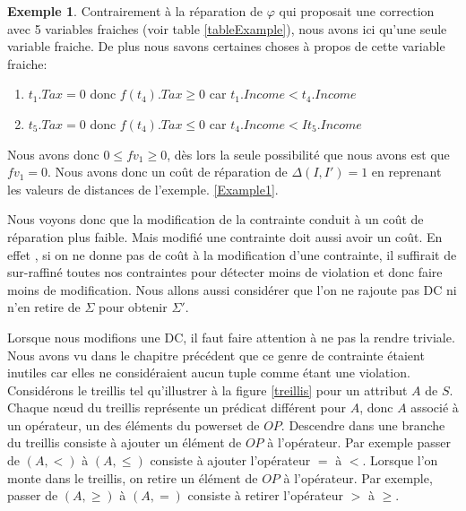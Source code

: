 \documentclass[letterpaper, 12pt]{report}
\theoremstyle{definition}
\newtheorem{myexample}{Exemple}
\begin{document}
\begin{myexample}
Contrairement à la réparation de $\varphi$ qui proposait une correction avec 5 variables fraiches (voir table \ref{tableExample}), nous avons ici qu'une seule variable fraiche. De plus nous savons certaines choses à propos de cette variable fraiche:

\begin{enumerate}

\item $t_1.Tax=0$ donc $f(t_4).Tax \geq 0$ car $t_1.Income<t_4.Income$
\item $t_5.Tax=0$ donc $f(t_4).Tax \leq 0$ car $t_4.Income < It_5.Income$

\end{enumerate}

Nous avons donc $0 \leq fv_1 \geq 0$, dès lors la seule possibilité que nous avons est que $fv_1 = 0$. Nous avons donc un coût de réparation de $\Delta(I,I') = 1$ en reprenant les valeurs de distances de l'exemple. \ref{Example1}.

\end{myexample}

Nous voyons donc que la modification de la contrainte conduit à un coût de réparation plus faible. Mais modifié une contrainte doit aussi avoir un coût. En effet , si on ne donne pas de coût à la modification d'une contrainte, il suffirait de sur-raffiné toutes nos contraintes pour détecter moins de violation et donc faire moins de modification. Nous allons aussi considérer que l'on ne rajoute pas DC ni n'en retire de $\Sigma$ pour obtenir $\Sigma'$.

Lorsque nous modifions une DC, il faut faire attention à ne pas la rendre triviale. Nous avons vu dans le chapitre précédent que ce genre de contrainte étaient inutiles car elles ne considéraient aucun tuple comme étant une violation. Considérons le treillis tel qu'illustrer à la figure \ref{treillis} pour un attribut $A$ de $S$. Chaque nœud du treillis représente un prédicat différent pour $A$, donc $A$ associé à un opérateur, un des éléments du powerset de $OP$. Descendre dans une branche du treillis consiste à ajouter un élément de $OP$ à l'opérateur. Par exemple passer de $(A,<)$ à $(A,\leq)$ consiste à ajouter l'opérateur $=$ à $<$. Lorsque l'on monte dans le treillis, on retire un élément de $OP$ à l'opérateur. Par exemple, passer de $(A, \geq)$ à $(A,=)$ consiste à retirer l'opérateur $>$ à $\geq$.\\
\end{document}
